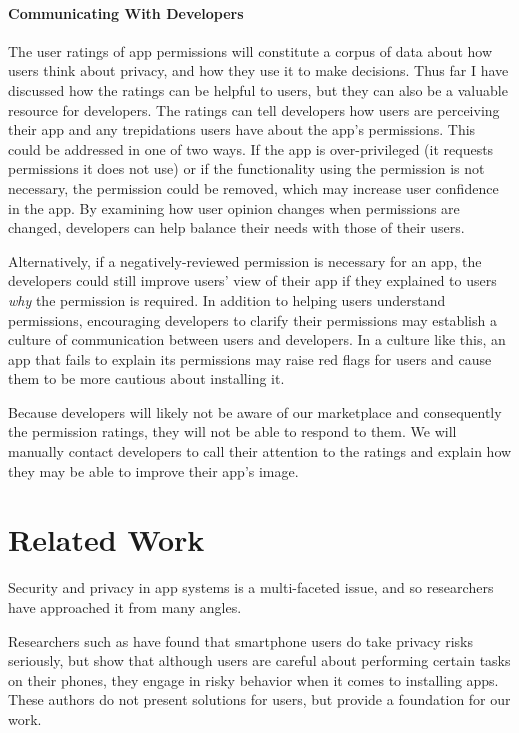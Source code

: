 \documentclass[11pt]{article}
\begin{document}
\paragraph{Communicating With Developers}
\label{subsubsec-dev-comm}

The user ratings of app permissions will constitute a corpus of 
data about how users think about privacy, and how they use it to make decisions.
Thus far I have discussed how the ratings can be helpful to users, but
they can also be a valuable resource for developers. The ratings can tell
developers how users are perceiving their app and any trepidations users
have about the app's permissions. This could be addressed in one of two 
ways. If the app is over-privileged (it requests permissions it does not
use) or if the functionality using the permission is not necessary, the
permission could be removed, which may increase user confidence in the 
app. By examining how user opinion changes when permissions are changed,
developers can help balance their needs with those of their users. 

Alternatively, if a negatively-reviewed permission is necessary for
an app, the developers could still improve users' view of their app
if they explained to users \emph{why} the permission is required. In 
addition to helping users understand permissions, encouraging developers 
to clarify their permissions may establish a culture of communication
between users and developers. In a culture like this, an app that fails
to explain its permissions may raise red flags for users and cause them 
to be more cautious about 
installing it. 

Because developers will likely not be aware of our marketplace and 
consequently the permission ratings, they will not be able to respond 
to them. We will manually contact developers to call their attention
to the ratings and explain how they may be able to improve their 
app's image.


\section{Related Work}

Security and privacy in app systems is a multi-faceted issue, and 
so researchers have approached it from many angles.

Researchers such as \citet{99-problems-SPSM12} have found 
that smartphone users do take privacy risks seriously, but
\citet{smartphone-user-conf-SOUPS12} show that although
users are careful about
performing certain tasks on their phones, they engage in risky behavior
when it comes to installing apps. These
authors do not present solutions for users, but 
provide a foundation for our work.
\end{document}
